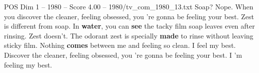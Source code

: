 \begin{textsample}{POS Dim 1 – 1980 – Score 4.00 – 1980/tv\_com\_1980\_13.txt}  \label{ex:f1_pos_047}
Soap?
Nope.
When you discover the cleaner, feeling obsessed, you 're gonna be feeling your best.
Zest is different from soap.
In \textbf{water}, you can \textbf{see} the tacky film soap leaves even after rinsing.
Zest doesn't.
The odorant zest is specially \textbf{made} to rinse without leaving sticky film.
Nothing \textbf{comes} between me and feeling so clean.
I feel my best.
Discover the cleaner, feeling obsessed, you 're gonna be feeling your best.
I 'm feeling my best.

\end{textsample}

